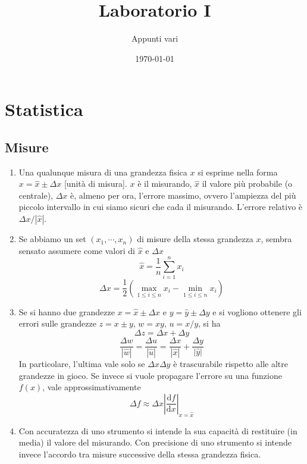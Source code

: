 \documentclass[a4paper,11pt]{article}
\title{Laboratorio I}
\author{Appunti vari}
\date{\today}
\begin{document}
	\maketitle
	\tableofcontents
	\newpage
\section{Statistica}
\subsection{Misure}
\begin{enumerate}
	\item Una qualunque misura di una grandezza fisica $x$ si esprime nella forma $x=\hat{x}\pm\Delta x$ [unità di misura]. $x$ è il misurando, $\hat{x}$ il valore più probabile (o centrale), $\Delta x$ è, almeno per ora, l'errore massimo, ovvero l'ampiezza del più piccolo intervallo in cui siamo sicuri che cada il misurando. L'errore relativo è $\Delta x/|\hat{x}|$.
	\item Se abbiamo un set $(x_1,\cdots,x_n)$ di misure della stessa grandezza $x$, sembra sensato assumere come valori di $\hat{x}$ e $\Delta x$ \[\hat{x}=\frac{1}{n}\sum_{i=1}^{n}x_i\] \[\Delta x=\frac{1}{2}\left(\max_{1\leq i\leq n}x_i-\min_{1\leq i\leq n}x_i\right)\]
	\item Se si hanno due grandezze $x=\hat{x}\pm\Delta x$ e $y=\hat{y}\pm\Delta y$ e si vogliono ottenere gli errori sulle grandezze $z=x\pm y$, $w=xy$, $u=x/y$, si ha
	\[\Delta z=\Delta x+\Delta y\]
	\[\frac{\Delta w}{|\hat{w}|}=\frac{\Delta u}{|\hat
	u|}=\frac{\Delta x}{|\hat{x}|}+\frac{\Delta y}{|\hat{y}|}\]
	In particolare, l'ultima vale solo se $\Delta x\Delta y$ è trascurabile rispetto alle altre grandezze in gioco.
	Se invece si vuole propagare l'errore su una funzione $f(x)$, vale approssimativamente
	\[\Delta f\approx\Delta x\left|\frac{\mathrm{d}f}{\mathrm{d}x}\right|_{x=\hat{x}}\]
	\item Con accuratezza di uno strumento si intende la sua capacità di restituire (in media) il valore del misurando. Con precisione di uno strumento si intende invece l'accordo tra misure successive della stessa grandezza fisica.

\end{enumerate}
\end{document}
